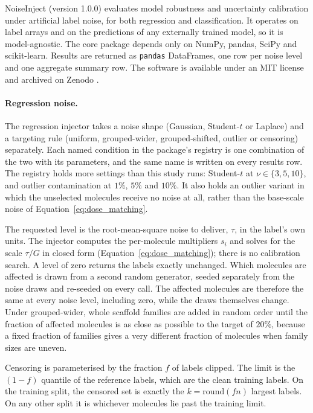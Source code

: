 NoiseInject (version 1.0.0) evaluates model robustness and uncertainty calibration under artificial
label noise, for both regression and classification. It operates on label arrays and on the
predictions of any externally trained model, so it is model-agnostic. The core package depends only
on NumPy, pandas, SciPy and scikit-learn. Results are returned as \texttt{pandas} DataFrames, one
row per noise level and one aggregate summary row. The software is available under an MIT license
and archived on Zenodo \citep{noiseinject}.

\paragraph{Regression noise.} The regression injector takes a noise shape (Gaussian, Student-$t$ or
Laplace) and a targeting rule (uniform, grouped-wider, grouped-shifted, outlier or censoring)
separately. Each named condition in the package's registry is one combination of the two with its
parameters, and the same name is written on every results row. The registry holds more settings
than this study runs: Student-$t$ at $\nu \in \{3, 5, 10\}$, and outlier contamination at $1\%$,
$5\%$ and $10\%$. It also holds an outlier variant in which the unselected molecules receive no
noise at all, rather than the base-scale noise of Equation~\ref{eq:dose_matching}.

The requested level is the root-mean-square noise to deliver, $\tau$, in the label's own units. The
injector computes the per-molecule multipliers $s_i$ and solves for the scale $\tau / G$ in closed
form (Equation~\ref{eq:dose_matching}); there is no calibration search. A level of zero returns the
labels exactly unchanged. Which molecules are affected is drawn from a second random generator,
seeded separately from the noise draws and re-seeded on every call. The affected molecules are
therefore the same at every noise level, including zero, while the draws themselves change. Under
grouped-wider, whole scaffold families are added in random order until the fraction of affected
molecules is as close as possible to the target of $20\%$, because a fixed fraction of families
gives a very different fraction of molecules when family sizes are uneven.

Censoring is parameterised by the fraction $f$ of labels clipped. The limit is the $(1-f)$ quantile
of the reference labels, which are the clean training labels. On the training split, the censored
set is exactly the $k = \mathrm{round}(fn)$ largest labels. On any other split it is whichever
molecules lie past the training limit.

